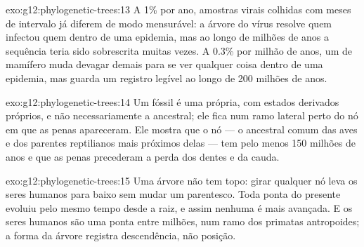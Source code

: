 \begin{solution}{exo:g12:phylogenetic-trees:13}
A 1\% por ano, amostras virais colhidas com meses de intervalo já
diferem de modo mensurável: a árvore do vírus resolve quem infectou
quem dentro de uma epidemia, mas ao longo de milhões de anos a
sequência teria sido sobrescrita muitas vezes. A 0.3\% por milhão de
anos, um  de mamífero muda devagar demais para se ver qualquer
coisa dentro de uma epidemia, mas guarda um registro legível ao longo
de 200 milhões de anos.
\end{solution}

\begin{solution}{exo:g12:phylogenetic-trees:14}
Um fóssil é uma  própria, com estados derivados próprios, e não
necessariamente a  ancestral; ele fica num ramo lateral perto
do nó em que as penas apareceram. Ele mostra que o nó --- o ancestral
comum das aves e dos parentes reptilianos mais próximos delas --- tem
pelo menos 150 milhões de anos e que as penas precederam a perda dos
dentes e da cauda.
\end{solution}

\begin{solution}{exo:g12:phylogenetic-trees:15}
Uma árvore não tem topo: girar qualquer nó leva os seres humanos para
baixo sem mudar um parentesco. Toda ponta do presente evoluiu pelo
mesmo tempo desde a raiz, e assim nenhuma é mais avançada. E os seres
humanos são uma ponta entre milhões, num ramo dos primatas
antropoides; a forma da árvore registra descendência, não posição.
\end{solution}

